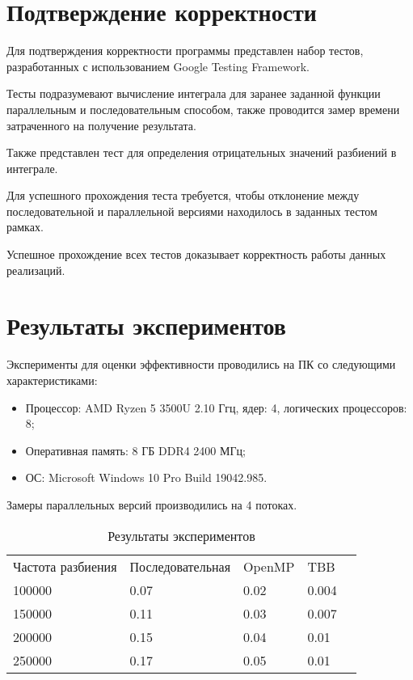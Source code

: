 \documentclass{report}
\begin{document}
\newpage

\section*{Подтверждение корректности}
Для подтверждения корректности программы представлен набор тестов, разработанных с использованием Google Testing Framework.
\par Тесты подразумевают вычисление интеграла для заранее заданной функции параллельным и последовательным способом, также проводится замер времени затраченного на получение результата.
\par Также представлен тест для определения отрицательных значений разбиений в интеграле.
\par Для успешного прохождения теста требуется, чтобы отклонение между последовательной и параллельной версиями находилось в заданных тестом рамках. \par Успешное прохождение всех тестов доказывает корректность работы данных реализаций.
\newpage

\section*{Результаты экспериментов}
Эксперименты для оценки эффективности проводились на ПК со следующими характеристиками:

\begin{itemize}
\item Процессор: AMD Ryzen 5 3500U 2.10 Ггц, ядер: 4, логических процессоров: 8;
\item Оперативная память: 8 ГБ DDR4 2400 МГц;
\item ОС: Microsoft Windows 10 Pro Build 19042.985.
\end{itemize}
\par Замеры параллельных версий производились на 4 потоках.
\begin{table}[!h]
\caption{Результаты экспериментов}
\centering
\begin{tabular}{lllll}
Частота разбиения & Последовательная & OpenMP & TBB \\
100000    & 0.07                    & 0.02       & 0.004  \\
150000    & 0.11                    & 0.03       & 0.007  \\
200000   & 0.15                    & 0.04       & 0.01  \\
250000   & 0.17                   & 0.05       & 0.01  \\
\end{tabular}
\end{table}
\end{document}
